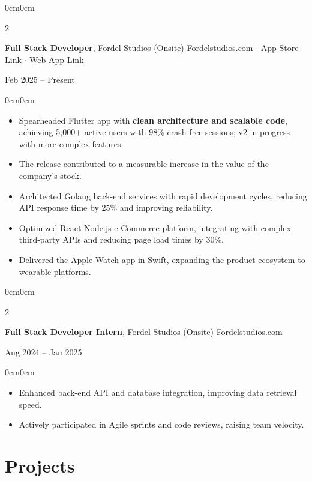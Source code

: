 \documentclass[10pt, letterpaper]{article}
\newenvironment{highlights}{
    \begin{itemize}[topsep=0.15cm, parsep=0.10cm, itemsep=0pt, leftmargin=10pt]
}{
    \end{itemize}
}
\newenvironment{onecolentry}{\begin{adjustwidth}{0cm}{0cm}}{\end{adjustwidth}}
\newenvironment{twocolentry}[2][]{
    \onecolentry
    \def\secondColumn{#2}
    \setcolumnwidth{\fill, 4.2cm}
    \begin{paracol}{2}
}{
    \switchcolumn \raggedleft \secondColumn
    \end{paracol}
    \endonecolentry
}
\begin{document}
\begin{twocolentry}{Feb 2025 – Present}
    \textbf{Full Stack Developer}, Fordel Studios (Onsite) 
    \href{https://Fordelstudios.com/}{Fordelstudios.com} $\cdot$
    \href{https://apps.apple.com/in/app/emsigner-sign-electronically/id1246670687?platform=appleWatch}{App Store Link} $\cdot$
    \href{https://formula.yellowchalk.dev/}{Web App Link}
\end{twocolentry}
\begin{onecolentry}
    \begin{highlights}
        \item Spearheaded Flutter app with \textbf{clean architecture and scalable code}, achieving 5,000+ active users with 98\% crash-free sessions; v2 in progress with more complex features. 
        \item The release contributed to a measurable increase in the value of the company's stock.
        \item Architected Golang back-end services with rapid development cycles, reducing API response time by 25\% and improving reliability.
        \item Optimized React-Node.js e-Commerce platform, integrating with complex third-party APIs and reducing page load times by 30\%.
        \item Delivered the Apple Watch app in Swift, expanding the product ecosystem to wearable platforms.
    \end{highlights}
\end{onecolentry}


\begin{twocolentry}{Aug 2024 – Jan 2025}
    \textbf{Full Stack Developer Intern}, Fordel Studios (Onsite) \href{https://Fordelstudios.com/}{Fordelstudios.com}
\end{twocolentry}
\begin{onecolentry}
    \begin{highlights}
        \item Enhanced back-end API and database integration, improving data retrieval speed.
        \item Actively participated in Agile sprints and code reviews, raising team velocity.
    \end{highlights}
\end{onecolentry}

\vspace{-0.1cm}
\section{Projects}
\end{document}
